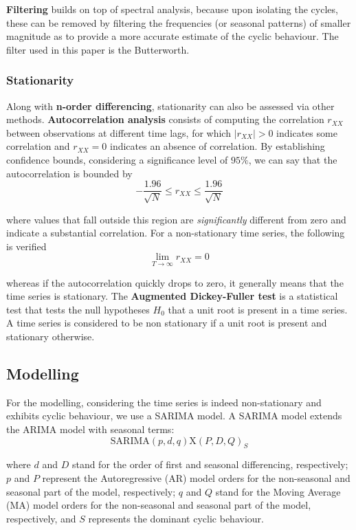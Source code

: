 \documentclass[conference]{IEEEtran}
\begin{document}
\textbf{Filtering} builds on top of spectral analysis, because upon isolating the cycles, these can be removed by filtering the frequencies (or seasonal patterns) of smaller magnitude as to provide a more accurate estimate of the cyclic behaviour. The filter used in this paper is the Butterworth.

\subsubsection{Stationarity}
Along with \textbf{n-order differencing}, stationarity can also be assessed via other methods. \textbf{Autocorrelation analysis} consists of computing the correlation $r_{XX}$ between observations at different time lags, for which $|r_{XX}|>0$ indicates some correlation and $r_{XX}=0$ indicates an absence of correlation. By establishing confidence bounds, considering a significance level of $95\%$, we can say that the autocorrelation is bounded by
\[
-\frac{1.96}{\sqrt{N}}\leq r_{XX}\leq\frac{1.96}{\sqrt{N}}
\]

where values that fall outside this region are \textit{significantly} different from zero and indicate a substantial correlation. For a non-stationary time series, the following is verified
\[
\lim_{T\to\infty}r_{XX}=0
\]

whereas if the autocorrelation quickly drops to zero, it generally means that the time series is stationary. The \textbf{Augmented Dickey-Fuller test} is a statistical test that tests the null hypotheses $H_0$ that a unit root is present in a time series. A time series is considered to be non stationary if a unit root is present and stationary otherwise.

\subsection{Modelling}
For the modelling, considering the time series is indeed non-stationary and exhibits cyclic behaviour, we use a SARIMA model. A SARIMA model extends the ARIMA model with seasonal terms:
\[
    \text{SARIMA}(p,d,q)\text{X}(P,D,Q)_S
\]

where $d$ and $D$ stand for the order of first and seasonal differencing, respectively; $p$ and $P$ represent the Autoregressive (AR) model orders for the non-seasonal and seasonal part of the model, respectively; $q$ and $Q$ stand for the Moving Average (MA) model orders for the non-seasonal and seasonal part of the model, respectively, and $S$ represents the dominant cyclic behaviour.
\end{document}
